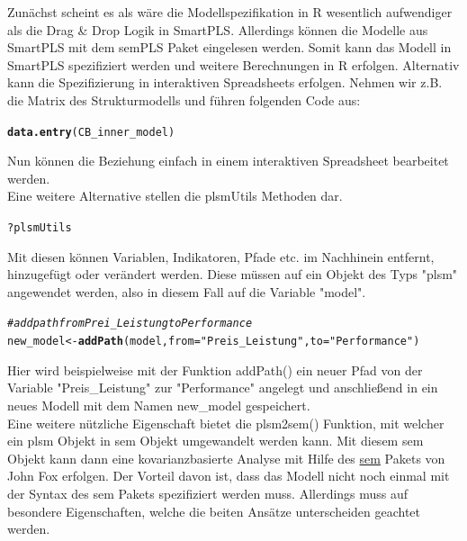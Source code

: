 \documentclass{article}\usepackage[]{graphicx}\usepackage[]{color}
\makeatletter
\newcommand{\hlstr}[1]{\textcolor[rgb]{0.192,0.494,0.8}{#1}}%
\newcommand{\hlcom}[1]{\textcolor[rgb]{0.678,0.584,0.686}{\textit{#1}}}%
\newcommand{\hlopt}[1]{\textcolor[rgb]{0,0,0}{#1}}%
\newcommand{\hlstd}[1]{\textcolor[rgb]{0.345,0.345,0.345}{#1}}%
\newcommand{\hlkwb}[1]{\textcolor[rgb]{0.69,0.353,0.396}{#1}}%
\newcommand{\hlkwc}[1]{\textcolor[rgb]{0.333,0.667,0.333}{#1}}%
\newcommand{\hlkwd}[1]{\textcolor[rgb]{0.737,0.353,0.396}{\textbf{#1}}}%
\newenvironment{kframe}{%
 \def\at@end@of@kframe{}%
 \ifinner\ifhmode%
  \def\at@end@of@kframe{\end{minipage}}%
  \begin{minipage}{\columnwidth}%
 \fi\fi%
 \def\FrameCommand##1{\hskip\@totalleftmargin \hskip-\fboxsep
 \colorbox{shadecolor}{##1}\hskip-\fboxsep
     \hskip-\linewidth \hskip-\@totalleftmargin \hskip\columnwidth}%
 \MakeFramed {\advance\hsize-\width
   \@totalleftmargin\z@ \linewidth\hsize
   \@setminipage}}%
 {\par\unskip\endMakeFramed%
 \at@end@of@kframe}
\newenvironment{knitrout}{}{} %
\makeatother
\begin{document}
Zunächst scheint es als wäre die Modellspezifikation in R wesentlich aufwendiger als die Drag \& Drop Logik in SmartPLS. Allerdings können die Modelle aus SmartPLS mit dem semPLS Paket eingelesen werden. Somit kann das Modell in SmartPLS spezifiziert werden und weitere Berechnungen in R erfolgen. Alternativ kann die Spezifizierung in interaktiven Spreadsheets erfolgen. Nehmen wir z.B. die Matrix des Strukturmodells und führen folgenden Code aus:
\begin{knitrout}
\color{fgcolor}\begin{kframe}
\begin{alltt}
\hlkwd{data.entry}\hlstd{(CB_inner_model)}
\end{alltt}
\end{kframe}
\end{knitrout}
Nun können die Beziehung einfach in einem interaktiven Spreadsheet bearbeitet werden.\\
Eine weitere Alternative stellen die plsmUtils Methoden dar.
\begin{knitrout}
\color{fgcolor}\begin{kframe}
\begin{alltt}
\hlopt{?}\hlstd{plsmUtils}
\end{alltt}
\end{kframe}
\end{knitrout}
Mit diesen können Variablen, Indikatoren, Pfade etc. im Nachhinein entfernt, hinzugefügt oder verändert werden. Diese müssen auf ein Objekt des Typs "plsm" angewendet werden, also in diesem Fall auf die Variable "model".
\begin{knitrout}
\color{fgcolor}\begin{kframe}
\begin{alltt}
\hlcom{#add path from Prei_Leistung to Performance}
\hlstd{new_model} \hlkwb{<-} \hlkwd{addPath}\hlstd{(model,} \hlkwc{from}\hlstd{=}\hlstr{"Preis_Leistung"}\hlstd{,} \hlkwc{to}\hlstd{=}\hlstr{"Performance"}\hlstd{)}
\end{alltt}
\end{kframe}
\end{knitrout}
Hier wird beispielweise mit der Funktion addPath() ein neuer Pfad von der Variable "Preis\_Leistung" zur "Performance" angelegt und anschließend in ein neues Modell mit dem Namen new\_model gespeichert.\\
Eine weitere nützliche Eigenschaft bietet die plsm2sem() Funktion, mit welcher ein plsm Objekt in sem Objekt umgewandelt werden kann. Mit diesem sem Objekt kann dann eine kovarianzbasierte Analyse mit Hilfe des \href{http://cran.r-project.org/web/packages/sem/index.html}{sem} Pakets von John Fox erfolgen. Der Vorteil davon ist, dass das Modell nicht noch einmal mit der Syntax des sem Pakets spezifiziert werden muss. Allerdings muss auf besondere Eigenschaften, welche die beiten Ansätze unterscheiden geachtet werden.
\end{document}
